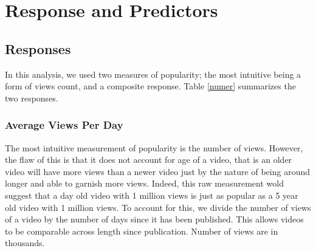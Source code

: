 \section{Response and Predictors}
\subsection{Responses}
In this analysis, we used two measures of popularity; the most intuitive being a form of views count, and a composite response. Table \ref{numer} summarizes the two responses. 
\subsubsection{Average Views Per Day}
The most intuitive measurement of popularity is the number of views. However, the flaw of this is that it does not account for age of a video, that is an older video will have more views than a newer video just by the nature of being around longer and able to garnish more views. Indeed, this raw measurement wold suggest that a day old video with 1 million views is just as popular as a 5 year old video with 1 million views. To account for this, we divide the number of views of a video by the number of days since it has been published. This allows videos to be comparable across length since publication. Number of views are in thousands.

